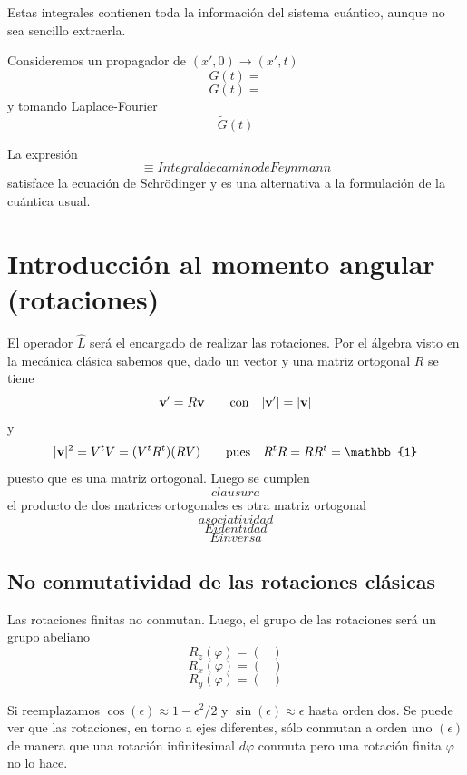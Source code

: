 \documentclass[10pt,oneside]{CBFT_book}
\begin{document}
Estas integrales contienen toda la información del sistema cuántico, aunque no sea sencillo extraerla.

Consideremos un propagador de $(x',0) \to (x',t)$
\[
	G(t) =
\]
\[
	G(t) =
\]
y tomando Laplace-Fourier 
\[
	\tilde{G}(t)
\]

La expresión 
\[
	\equiv Integral de camino de Feynmann
\]
satisface la ecuación de Schrödinger y es una alternativa a la formulación de la cuántica usual.

\section{Introducción al momento angular (rotaciones)}

El operador $\hat{L}$ será el encargado de realizar las rotaciones. Por el álgebra visto en la mecánica 
clásica sabemos que, dado un vector  y una matriz ortogonal $R$ se tiene
\[
	\vb{v}' = R \vb{v} \qquad \text{con} \quad |\vb{v}'|=|\vb{v}|
\]
y 
\[
	|\vb{v}|^2 = V^t V = (V^t R^t) (R V) \qquad \text{pues} \quad R^tR=RR^t = \mathbb{1}
\]
puesto que es una matriz ortogonal. Luego se cumplen 
\[
	clausura	
\]
el producto de dos matrices ortogonales es otra matriz ortogonal
\[
	asociatividad
\]
\[
	E identidad
\]
\[
	E inversa
\]

\subsection{No conmutatividad de las rotaciones clásicas}

Las rotaciones finitas no conmutan. Luego, el grupo de las rotaciones será un grupo abeliano
\[
	R_z(\varphi) = \begin{pmatrix}
	 \\
	\end{pmatrix}
\]
\[
	R_x(\varphi) = \begin{pmatrix}
	 \\
	\end{pmatrix}
\]
\[
	R_y(\varphi) = \begin{pmatrix}
	 \\
	\end{pmatrix}
\]

Si reemplazamos $\cos(\epsilon) \approx 1 - \epsilon^2/2$ y $\sin(\epsilon) \approx \epsilon$ hasta orden dos.
Se puede ver que las rotaciones, en torno a ejes diferentes, sólo conmutan a orden uno $(\epsilon)$ de manera 
que una rotación infinitesimal $d\varphi$ conmuta pero una rotación finita $\varphi$ no lo hace.
\end{document}
